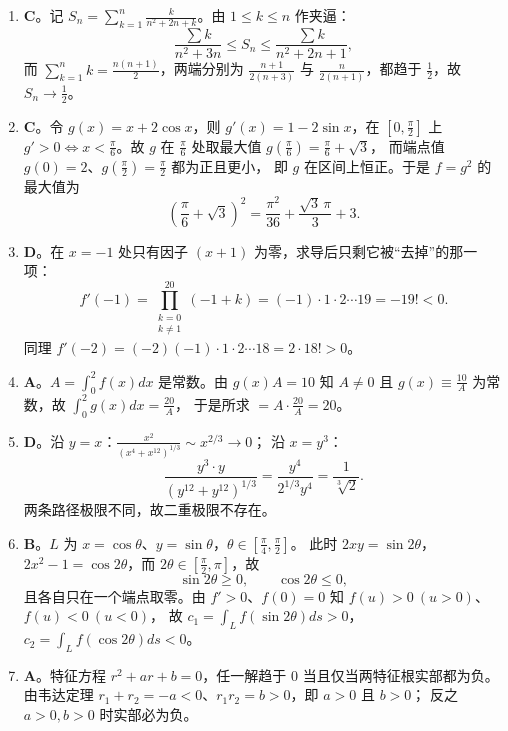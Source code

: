 \begin{enumerate}
{\begin{enumerate}
	\item
	\textbf{C}。记 $S_n=\sum\limits_{k=1}^{n}\frac{k}{n^2+2n+k}$。由 $1\leqslant k\leqslant n$ 作夹逼：
	\[
	\frac{\sum k}{n^2+3n}\leqslant S_n\leqslant\frac{\sum k}{n^2+2n+1},
	\]
	而 $\sum\limits_{k=1}^{n}k=\frac{n(n+1)}{2}$，两端分别为
	$\frac{n+1}{2(n+3)}$ 与 $\frac{n}{2(n+1)}$，都趋于 $\frac12$，故 $S_n\to\frac12$。

	\item
	\textbf{C}。令 $g(x)=x+2\cos x$，则 $g'(x)=1-2\sin x$，在 $\left[0,\frac{\pi}{2}\right]$ 上
	$g'>0\Leftrightarrow x<\frac{\pi}{6}$。故 $g$ 在 $\frac{\pi}{6}$ 处取最大值
	$g\left(\frac{\pi}{6}\right)=\frac{\pi}{6}+\sqrt3$，
	而端点值 $g(0)=2$、$g\left(\frac{\pi}{2}\right)=\frac{\pi}{2}$ 都为正且更小，
	即 $g$ 在区间上恒正。于是 $f=g^2$ 的最大值为
	\[
	\left(\frac{\pi}{6}+\sqrt3\right)^2=\frac{\pi^2}{36}+\frac{\sqrt3\,\pi}{3}+3 .
	\]

	\item
	\textbf{D}。在 $x=-1$ 处只有因子 $(x+1)$ 为零，求导后只剩它被“去掉”的那一项：
	\[
	f'(-1)=\prod_{\substack{k=0\\k\neq1}}^{20}(-1+k)=(-1)\cdot1\cdot2\cdots19=-19!<0 .
	\]
	同理
	$f'(-2)=(-2)(-1)\cdot1\cdot2\cdots18=2\cdot18!>0$。

	\item
	\textbf{A}。$A=\int_0^2f(x)dx$ 是常数。由 $g(x)A=10$ 知 $A\neq0$ 且
	$g(x)\equiv\frac{10}{A}$ 为常数，故 $\int_0^2g(x)dx=\frac{20}{A}$，
	于是所求 $=A\cdot\frac{20}{A}=20$。

	\item
	\textbf{D}。沿 $y=x$：$\frac{x^2}{\left(x^4+x^{12}\right)^{1/3}}\sim x^{2/3}\to0$；
	沿 $x=y^3$：
	\[
	\frac{y^3\cdot y}{\left(y^{12}+y^{12}\right)^{1/3}}=\frac{y^4}{2^{1/3}y^4}=\frac{1}{\sqrt[3]{2}} .
	\]
	两条路径极限不同，故二重极限不存在。

	\item
	\textbf{B}。$L$ 为 $x=\cos\theta$、$y=\sin\theta$，$\theta\in\left[\frac{\pi}{4},\frac{\pi}{2}\right]$。
	此时 $2xy=\sin2\theta$，$2x^2-1=\cos2\theta$，而 $2\theta\in\left[\frac{\pi}{2},\pi\right]$，故
	\[
	\sin2\theta\geqslant0,\qquad \cos2\theta\leqslant0,
	\]
	且各自只在一个端点取零。由 $f'>0$、$f(0)=0$ 知 $f(u)>0\ (u>0)$、$f(u)<0\ (u<0)$，
	故 $c_1=\int_Lf(\sin2\theta)ds>0$，$c_2=\int_Lf(\cos2\theta)ds<0$。

	\item
	\textbf{A}。特征方程 $r^2+ar+b=0$，任一解趋于 $0$ 当且仅当两特征根实部都为负。
	由韦达定理 $r_1+r_2=-a<0$、$r_1r_2=b>0$，即 $a>0$ 且 $b>0$；
	反之 $a>0,b>0$ 时实部必为负。


\end{enumerate}}
\end{enumerate}
